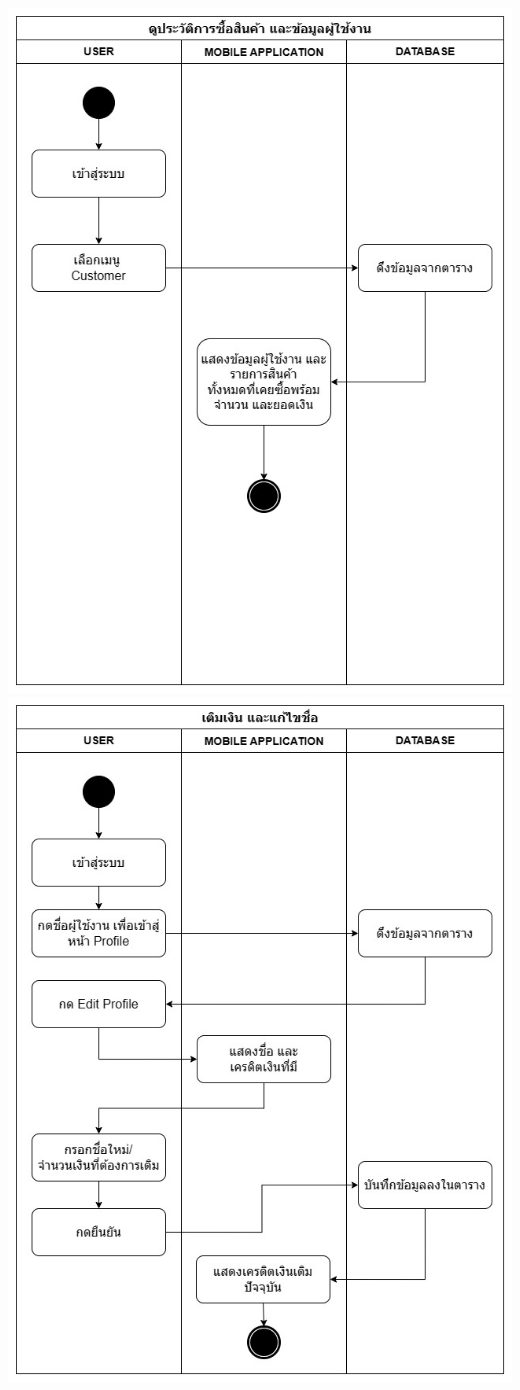 \begin{center}
    \includegraphics[scale=0.25]{pic/diagram/ad-mobile2.jpg}
    \includegraphics[scale=0.25]{pic/diagram/ad-mobile4.jpg}

\end{center}
